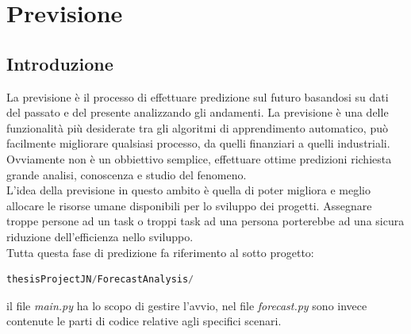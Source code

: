 \documentclass[%
    corpo=12pt,
    twoside,
    oldstyle,
    autoretitolo,
    greek,
    evenboxes,
]{toptesi}
\begin{document}

\chapter{Previsione}
\label{chap:forecasting}
\section{Introduzione}
La previsione è il processo di effettuare predizione sul futuro basandosi su dati del passato e del presente analizzando gli andamenti. La previsione è una delle funzionalità più desiderate tra gli algoritmi di apprendimento automatico, può facilmente migliorare qualsiasi processo, da quelli finanziari a quelli industriali. Ovviamente non è un obbiettivo semplice, effettuare ottime predizioni richiesta grande analisi, conoscenza e studio del fenomeno.\\
L'idea della previsione in questo ambito è quella di poter migliora e meglio allocare le risorse umane disponibili per lo sviluppo dei progetti. Assegnare troppe persone ad un task o troppi task ad una persona porterebbe ad una sicura riduzione dell'efficienza nello sviluppo.\\
Tutta questa fase di predizione fa riferimento al sotto progetto:
\begin{lstlisting}[language=Python, frame=single, basicstyle=\small]
  thesisProjectJN/ForecastAnalysis/
\end{lstlisting}
il file \textit{main.py} ha lo scopo di gestire l'avvio, nel file \textit{forecast.py} sono invece contenute le parti di codice relative agli specifici scenari.
\end{document}
